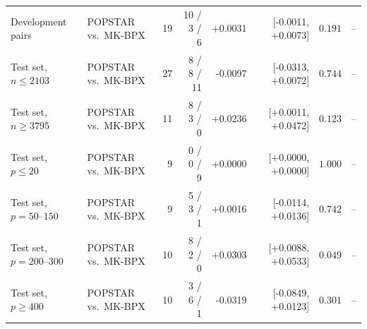 \begin{tabular}{llrrrrrr}
\quad Development pairs & POPSTAR vs.\ MK-BPX & 19 & 10 / 3 / 6 & +0.0031 & [-0.0011, +0.0073] & $0.191$ & -- \\
\quad Test set, $n\leq 2103$ & POPSTAR vs.\ MK-BPX & 27 & 8 / 8 / 11 & -0.0097 & [-0.0313, +0.0072] & $0.744$ & -- \\
\quad Test set, $n\geq 3795$ & POPSTAR vs.\ MK-BPX & 11 & 8 / 3 / 0 & +0.0236 & [+0.0011, +0.0472] & $0.123$ & -- \\
\quad Test set, $p\leq 20$ & POPSTAR vs.\ MK-BPX & 9 & 0 / 0 / 9 & +0.0000 & [+0.0000, +0.0000] & $1.000$ & -- \\
\quad Test set, $p=50$--$150$ & POPSTAR vs.\ MK-BPX & 9 & 5 / 3 / 1 & +0.0016 & [-0.0114, +0.0136] & $0.742$ & -- \\
\quad Test set, $p=200$--$300$ & POPSTAR vs.\ MK-BPX & 10 & 8 / 2 / 0 & +0.0303 & [+0.0088, +0.0533] & $0.049$ & -- \\
\quad Test set, $p\geq 400$ & POPSTAR vs.\ MK-BPX & 10 & 3 / 6 / 1 & -0.0319 & [-0.0849, +0.0123] & $0.301$ & -- \\
\bottomrule
\end{tabular}